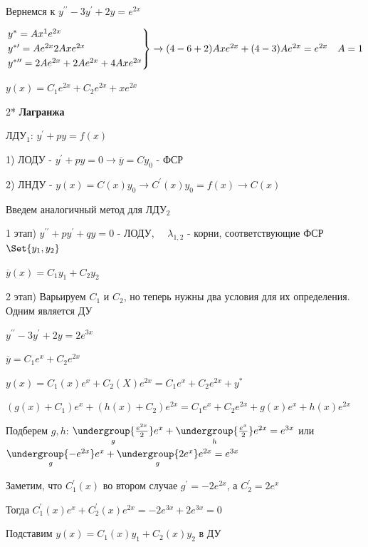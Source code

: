 \documentclass[12pt]{article}
\begin{document}
    \Ex Вернемся к $y^{\prime\prime} - 3y^\prime + 2y = e^{2x}$

    $\begin{rcases*}
    y^* = Ax^1 e^{2x} \\

    y^{*\prime} = Ae^{2x} 2Axe^{2x} \\

    y^{*\prime\prime} = 2Ae^{2x} + 2Ae^{2x} + 4Axe^{2x}
    \end{rcases*} \to (4 - 6 + 2) Axe^{2x} + (4 - 3) Ae^{2x} = e^{2x} \quad A = 1$

    $y(x) = C_1 e^{2x} + C_2 e^{2x} + xe^{2x}$

    \vspace{10mm}

    2* \textbf{Лагранжа}

    \Mem ЛДУ$_1$: $y^\prime + py = f(x)$

    1) ЛОДУ - $y^\prime + py = 0 \to \overline{y} = Cy_0$ - ФСР

    2) ЛНДУ - $y(x) = C(x)y_0 \longrightarrow C^\prime(x) y_0 = f(x) \to C(x)$

    \Nota Введем аналогичный метод для ЛДУ$_2$

    1 этап) $y^{\prime\prime} + py^\prime + qy = 0$ - ЛОДУ, $\quad \lambda_{1, 2}$ - корни, соответствующие ФСР $\Set{y_1, y_2}$

    $\overline{y}(x) = C_1 y_1 + C_2 y_2$

    2 этап) Варьируем $C_1$ и $C_2$, но теперь нужны два условия для их определения. Одним является ДУ

    \Ex $y^{\prime\prime} - 3y^\prime + 2y = 2e^{3x}$

    $\overline{y} = C_1 e^x + C_2 e^{2x}$

    $y(x) = C_1(x)e^x + C_2(X)e^{2x} = C_1 e^x + C_2 e^{2x} + y^*$

    $(g(x) + C_1)e^x + (h(x) + C_2)e^{2x} = C_1 e^x + C_2 e^{2x} + g(x)e^x + h(x)e^{2x}$

    Подберем $g, h$: $\underset{g}{\undergroup{\frac{e^{2x}}{2}}}e^x + \underset{h}{\undergroup{\frac{e^x}{2}}}e^{2x} = e^{3x}$ или
    $\underset{g}{\undergroup{-e^{2x}}} e^x + \underset{g}{\undergroup{2e^x}} e^{2x} = e^{3x}$

    Заметим, что $C_1^\prime(x)$ во втором случае $g^\prime = -2e^{2x}$, а $C_2^\prime = 2e^x$

    Тогда $C_1^\prime(x) e^x + C^\prime_2 (x) e^{2x} = -2e^{3x} + 2e^{3x} = 0$

    \Nota Подставим $y(x) = C_1 (x) y_1 + C_2 (x) y_2$ в ДУ
\end{document}
